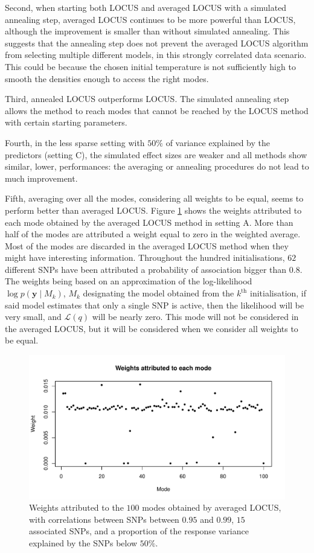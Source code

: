 \documentclass[a4paper, 11pt]{report}
\numberwithin{equation}{chapter}
\begin{document}
Second, when starting both LOCUS and averaged LOCUS with a simulated annealing step, averaged LOCUS continues to be more powerful than LOCUS, although the improvement is smaller than without simulated annealing. This suggests that the annealing step does not prevent the averaged LOCUS algorithm from selecting multiple different models, in this strongly correlated data scenario. This could be because the chosen initial temperature is not sufficiently high to smooth the densities enough to access the right modes.

Third, annealed LOCUS outperforms LOCUS. The simulated annealing step allows the method to reach modes that cannot be reached by the LOCUS method with certain starting parameters. 

Fourth, in the less sparse setting with $50\%$ of variance explained by the predictors (setting C), the simulated effect sizes are weaker and all methods show similar, lower, performances: the averaging or annealing procedures do not lead to much improvement.

Fifth, averaging over all the modes, considering all weights to be equal, seems to perform better than averaged LOCUS. Figure \ref{fig:weightsModes} shows the weights attributed to each mode obtained by the averaged LOCUS method in setting A. More than half of the modes are attributed a weight equal to zero in the weighted average. Most of the modes are discarded in the averaged LOCUS method when they might have interesting information. Throughout the hundred initialisations, $62$ different SNPs have been attributed a probability of association bigger than $0.8$. The weights being based on an approximation of the log-likelihood $\log p(\boldsymbol{y}\mid M_k)$, $M_k$ designating the model obtained from the $k^{\mathrm{th}}$ initialisation, if said model estimates that only a single SNP is active, then the likelihood will be very small, and $\mathcal{L}(q)$ will be nearly zero. This mode will not be considered in the averaged LOCUS, but it will be considered when we consider all weights to be equal.

\begin{figure}[h!]
\centering
\includegraphics[width=5in]{images/Weights_Mode.pdf}
\caption{\label{fig:weightsModes}Weights attributed to the $100$ modes obtained by averaged LOCUS, with correlations between SNPs between $0.95$ and $0.99$, $15$ associated SNPs, and a proportion of the response variance explained by the SNPs below $50\%$.}
\end{figure}
\end{document}
